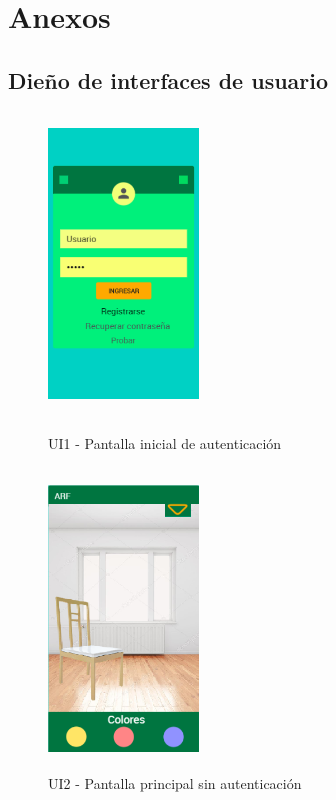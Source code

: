 \chapter{Anexos}

\section{Dieño de interfaces de usuario}
\begin{figure}[h!]
	\begin{minipage}{0.48\textwidth}
		\centering
		\includegraphics[width=4cm,height=8cm]{imagenes/Anexos/Mockup/1-Login.PNG}
		\caption{UI1 - Pantalla inicial de autenticación}
		\label{fig:analogo}
	\end{minipage}\hfill
	\begin{minipage}{0.48\textwidth}
		\centering
		\includegraphics[width=4cm,height=8cm]{imagenes/Anexos/Mockup/2-principalSinLogin.png}
		\caption{UI2 - Pantalla principal sin autenticación}
		\label{fig:analogo}
	\end{minipage}\hfill
\end{figure}

